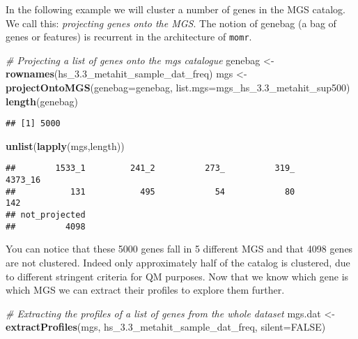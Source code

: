 \documentclass[]{article}
\newenvironment{Shaded}{\begin{snugshade}}{\end{snugshade}}
\newcommand{\KeywordTok}[1]{\textcolor[rgb]{0.13,0.29,0.53}{\textbf{{#1}}}}
\newcommand{\DataTypeTok}[1]{\textcolor[rgb]{0.13,0.29,0.53}{{#1}}}
\newcommand{\StringTok}[1]{\textcolor[rgb]{0.31,0.60,0.02}{{#1}}}
\newcommand{\CommentTok}[1]{\textcolor[rgb]{0.56,0.35,0.01}{\textit{{#1}}}}
\newcommand{\OtherTok}[1]{\textcolor[rgb]{0.56,0.35,0.01}{{#1}}}
\newcommand{\NormalTok}[1]{{#1}}
\begin{document}
In the following example we will cluster a number of genes in the MGS
catalog. We call this: \emph{projecting genes onto the MGS}. The notion
of genebag (a bag of genes or features) is recurrent in the architecture
of \texttt{momr}.

\begin{Shaded}
\begin{Highlighting}[]
\CommentTok{# Projecting a list of genes onto the mgs catalogue}
\NormalTok{genebag <-}\StringTok{ }\KeywordTok{rownames}\NormalTok{(hs_3.3_metahit_sample_dat_freq)}
\NormalTok{mgs <-}\StringTok{ }\KeywordTok{projectOntoMGS}\NormalTok{(}\DataTypeTok{genebag=}\NormalTok{genebag, }\DataTypeTok{list.mgs=}\NormalTok{mgs_hs_3.3_metahit_sup500)}
\KeywordTok{length}\NormalTok{(genebag)}
\end{Highlighting}
\end{Shaded}

\begin{verbatim}
## [1] 5000
\end{verbatim}

\begin{Shaded}
\begin{Highlighting}[]
\KeywordTok{unlist}\NormalTok{(}\KeywordTok{lapply}\NormalTok{(mgs,length))}
\end{Highlighting}
\end{Shaded}

\begin{verbatim}
##        1533_1         241_2          273_          319_       4373_16 
##           131           495            54            80           142 
## not_projected 
##          4098
\end{verbatim}

You can notice that these 5000 genes fall in 5 different MGS and that
4098 genes are not clustered. Indeed only approximately half of the
catalog is clustered, due to different stringent criteria for QM
purposes. Now that we know which gene is which MGS we can extract their
profiles to explore them further.

\begin{Shaded}
\begin{Highlighting}[]
\CommentTok{# Extracting the profiles of a list of genes from the whole dataset}
\NormalTok{mgs.dat <-}\StringTok{ }\KeywordTok{extractProfiles}\NormalTok{(mgs, hs_3.3_metahit_sample_dat_freq, }\DataTypeTok{silent=}\OtherTok{FALSE}\NormalTok{)}
\end{Highlighting}
\end{Shaded}
\end{document}
